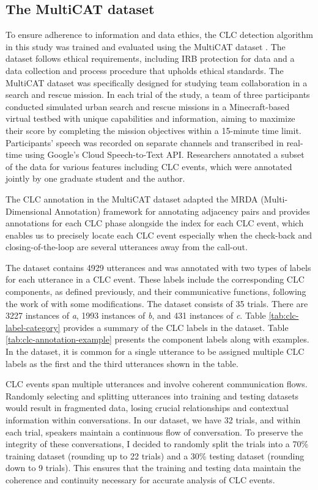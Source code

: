 \documentclass[11pt]{article}
\begin{document}
\subsection{The MultiCAT dataset}
To ensure adherence to information and data ethics, the CLC detection algorithm in this study was trained and evaluated using the MultiCAT dataset \citep{Culnan.ea:2023}. The dataset follows ethical requirements, including IRB protection for data and a data collection and process procedure that upholds ethical standards. The MultiCAT dataset was specifically designed for studying team collaboration in a search and rescue mission. In each trial of the study, a team of three participants conducted simulated urban search and rescue missions in a Minecraft-based virtual testbed with unique capabilities and information, aiming to maximize their score by completing the mission objectives within a 15-minute time limit. Participants' speech was recorded on separate channels and transcribed in real-time using Google's Cloud Speech-to-Text API. Researchers annotated a subset of the data for various features including CLC events, which were annotated jointly by one graduate student and the author.

The CLC annotation in the MultiCAT dataset adapted the MRDA (Multi-Dimensional Annotation) framework for annotating adjacency pairs and provides annotations for each CLC phase alongside the index for each CLC event, which enables us to precisely locate each CLC event especially when the check-back and closing-of-the-loop are several utterances away from the call-out.

The dataset contains 4929 utterances and was annotated with two types of labels for each utterance in a CLC event. These labels include the corresponding CLC components, as defined previously, and their communicative functions, following the work of \citet{marzuki2019closed} with some modifications. The dataset consists of 35 trials. There are 3227 instances of \textit{a}, 1993 instances of \textit{b}, and 431 instances of \textit{c}. Table  \ref{tab:clc-label-category} provides a summary of the CLC labels in the dataset. Table \ref{tab:clc-annotation-example} presents the component labels along with examples. In the dataset, it is common for a single utterance to be assigned multiple CLC labels as the first and the third utterances shown in the table.

CLC events span multiple utterances and involve coherent communication flows. Randomly selecting and splitting utterances into training and testing datasets would result in fragmented data, losing crucial relationships and contextual information within conversations. In our dataset, we have 32 trials, and within each trial, speakers maintain a continuous flow of conversation. To preserve the integrity of these conversations, I decided to randomly split the trials into a 70\% training dataset (rounding up to 22 trials) and a 30\% testing dataset (rounding down to 9 trials). This ensures that the training and testing data maintain the coherence and continuity necessary for accurate analysis of CLC events.
\end{document}
